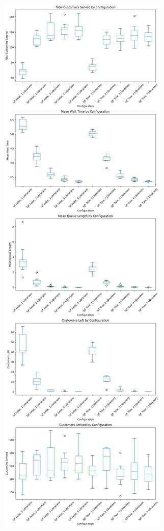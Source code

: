 \documentclass[10pt,twocolumn]{article}
\begin{document}
\begin{figure}
	\centering
	\includegraphics[width=0.7\linewidth]{./boxplot}
	\caption{}
	\label{fig:boxplot}
\end{figure}
\end{document}
